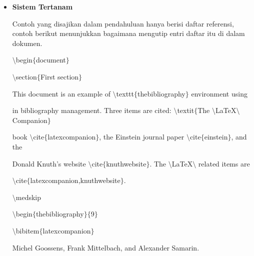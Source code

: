 \begin{itemize}
\vspace{12pt}
	\item {\fontsize{14pt}{14pt}\selectfont \textbf{Sistem Tertanam}}\par

Contoh yang disajikan dalam pendahuluan hanya berisi daftar referensi, contoh berikut menunjukkan bagaimana mengutip entri daftar itu di dalam dokumen.\par

\hspace*{0.5in}$\setminus$begin$ \{ $document$ \} $ \par

\hspace*{0.5in}$\setminus$section$ \{ $First section$ \} $\par

\hspace*{0.5in}This document is an example of $\setminus$texttt$ \{ $thebibliography$ \} $ environment using \par

\hspace*{0.5in}in bibliography management. Three items are cited: $\setminus$textit$ \{ $The $\setminus$LaTeX$\setminus$ Companion$ \} $ \par

\hspace*{0.5in}book $\setminus$cite$ \{ $latexcompanion$ \} $, the Einstein journal paper $\setminus$cite$ \{ $einstein$ \} $, and the \par

\hspace*{0.5in}Donald Knuth's website $\setminus$cite$ \{ $knuthwebsite$ \} $. The $\setminus$LaTeX$\setminus$ related items are\par

\hspace*{0.5in}$\setminus$cite$ \{ $latexcompanion,knuthwebsite$ \} $. \par

\hspace*{0.5in}$\setminus$medskip \par

\hspace*{0.5in}$\setminus$begin$ \{ $thebibliography$ \} $$ \{ $9$ \} $\par

\hspace*{0.5in}$\setminus$bibitem$ \{ $latexcompanion$ \} $ \par

\hspace*{0.5in}Michel Goossens, Frank Mittelbach, and Alexander Samarin. \par


\end{itemize}
